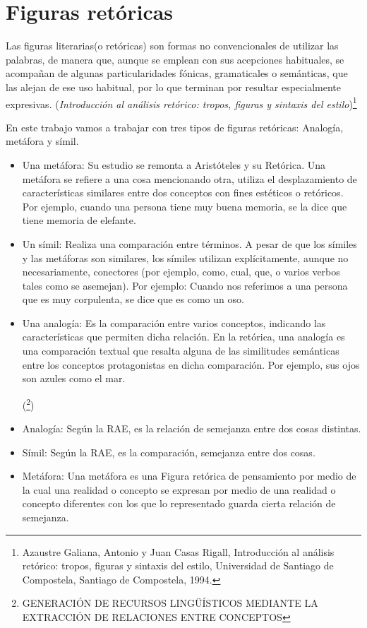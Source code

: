 \section{Figuras retóricas}

 Las figuras literarias(o retóricas) son formas no convencionales de utilizar las palabras, de manera que, aunque se emplean con sus acepciones habituales, se acompañan de algunas particularidades fónicas, gramaticales o semánticas, que las alejan de ese uso habitual, por lo que terminan por resultar especialmente expresivas. (\textit {Introducción al análisis retórico: tropos, figuras y sintaxis del estilo})\footnote{Azaustre Galiana, Antonio y Juan Casas Rigall, Introducción al análisis retórico: tropos, figuras y sintaxis del estilo, Universidad de Santiago de Compostela, Santiago de Compostela, 1994.}

En este trabajo vamos a trabajar con tres tipos de figuras retóricas: Analogía, metáfora y símil.
\begin{itemize}
	\item Una metáfora: Su estudio se remonta a Aristóteles y su Retórica. Una metáfora se refiere a una cosa mencionando otra, utiliza el desplazamiento de características similares entre dos conceptos con fines estéticos o retóricos. Por ejemplo, cuando una persona tiene muy buena memoria, se la dice que tiene memoria de elefante.
	
	\item Un símil: Realiza una comparación entre términos. A pesar de que los símiles y las metáforas son similares, los símiles utilizan explícitamente, aunque no necesariamente, conectores (por ejemplo, como, cual, que, o varios verbos tales como se asemejan).
	Por ejemplo: Cuando nos referimos a una persona que es muy corpulenta, se dice que es como un oso.
	
	\item Una analogía: Es la comparación entre varios conceptos, indicando las características que permiten dicha relación. En la retórica, una analogía es una comparación textual que resalta alguna de las similitudes semánticas entre los conceptos protagonistas en dicha comparación. Por ejemplo, sus ojos son azules como el mar.
	
(\footnote {GENERACIÓN DE RECURSOS LINGÜÍSTICOS MEDIANTE LA EXTRACCIÓN DE RELACIONES ENTRE CONCEPTOS})	
	
\end{itemize}

\begin{itemize}
\item Analogía: Según la RAE, es la relación de semejanza entre dos cosas distintas.
\item Símil: Según la RAE, es la comparación, semejanza entre dos cosas.
\item Metáfora: Una metáfora es una Figura retórica de pensamiento por medio de la cual una realidad o concepto se expresan por medio de una realidad o concepto diferentes con los que lo representado guarda cierta relación de semejanza.
\end{itemize}



